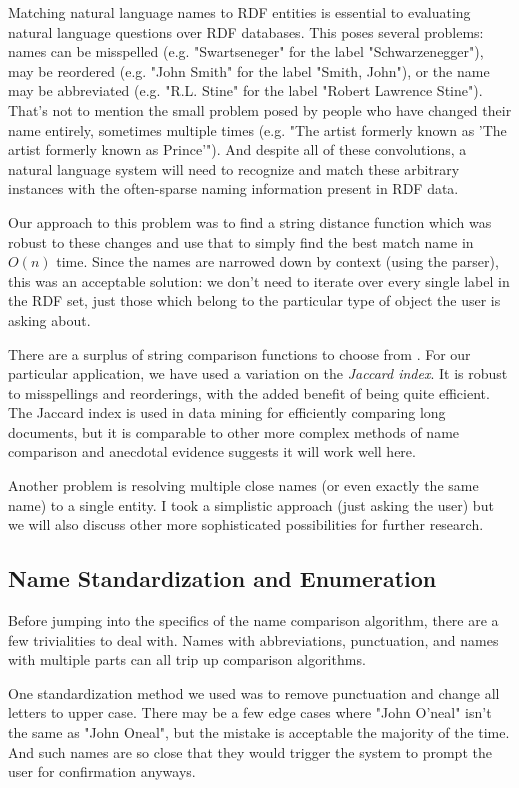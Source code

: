 \documentclass[11pt]{article}
\begin{document}
Matching natural language names to RDF entities is essential to evaluating
natural language questions over RDF databases. This poses several problems:
names can be misspelled (e.g. "Swartseneger" for the label "Schwarzenegger"), 
may be reordered (e.g. "John Smith" for the label "Smith, John"),
or the name may be abbreviated (e.g. "R.L. Stine" for the label "Robert Lawrence Stine").
That's not to mention the small problem posed by people who have
changed their name entirely, sometimes multiple times
(e.g. "The artist formerly known as 'The artist formerly known as Prince'").
And despite all of these convolutions, a natural language system will need to
recognize and match these arbitrary instances with the often-sparse naming information
present in RDF data.

Our approach to this problem was to find a string distance function which was
robust to these changes and use that to simply
find the best match name in $O(n)$ time. Since the names are narrowed down by
context (using the parser), this was an acceptable solution: we don't need to iterate
over every single label in the RDF set, just those which belong to the particular
type of object the user is asking about.

There are a surplus of string comparison functions to choose from \cite{comparison}.
For our particular application, we have used a variation on the {\em Jaccard index}.
It is robust to misspellings and reorderings, with the added benefit of being quite efficient.
The Jaccard index is used in data mining for efficiently comparing long documents,
but it is comparable to other more complex methods of name comparison \cite{comparison} and 
anecdotal evidence suggests it will work well here.

Another problem is resolving multiple close names (or even exactly the same name) to a single entity.
I took a simplistic approach (just asking the user) but we will also discuss other more
sophisticated possibilities for further research. 

\subsection{Name Standardization and Enumeration}
Before jumping into the specifics of the name comparison algorithm, there are a few trivialities
to deal with. Names with abbreviations, punctuation, and names with multiple parts can all
trip up comparison algorithms.

One standardization method we used was to remove punctuation and change all letters to upper case.
There may be a few edge cases where "John O'neal" isn't the same as "John Oneal",
but the mistake is acceptable the majority of the time. And such names are so close that they would
trigger the system to prompt the user for confirmation anyways.
\end{document}
